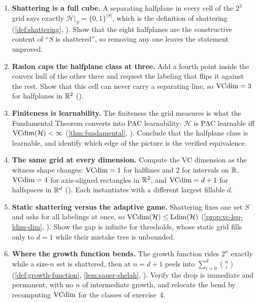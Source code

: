 \begin{enumerate}[leftmargin=*,itemsep=3pt]
\item \textbf{Shattering is a full cube.} A separating halfplane in every cell of the $2^3$ grid says exactly $\mathcal{H}|_S = \{0,1\}^{|S|}$, which is the definition of shattering (\cref{def:shattering}, ). Show that the eight halfplanes are the constructive content of ``$S$ is shattered'', so removing any one leaves the statement unproved.

\item \textbf{Radon caps the halfplane class at three.} Add a fourth point inside the convex hull of the other three and request the labeling that flips it against the rest. Show that this cell can never carry a separating line, so $\mathrm{VCdim} = 3$ for halfplanes in $\mathbb{R}^2$ ().

\item \textbf{Finiteness is learnability.} The finiteness the grid measures is what the Fundamental Theorem converts into PAC learnability: $\mathcal{H}$ is PAC learnable iff $\mathrm{VCdim}(\mathcal{H}) < \infty$ (\cref{thm:fundamental}, ). Conclude that the halfplane class is learnable, and identify which edge of the picture is the verified equivalence.

\item \textbf{The same grid at every dimension.} Compute the VC dimension as the witness shape changes: $\mathrm{VCdim} = 1$ for halflines and $2$ for intervals on $\mathbb{R}$, $\mathrm{VCdim} = 4$ for axis-aligned rectangles in $\mathbb{R}^2$, and $\mathrm{VCdim} = d+1$ for halfspaces in $\mathbb{R}^d$ (\cite{BlumerEhrenfeuchtHausslerWarmuth1989}). Each instantiates  with a different largest fillable $d$.

\item \textbf{Static shattering versus the adaptive game.} Shattering fixes one set $S$ and asks for all labelings at once, so $\mathrm{VCdim}(\mathcal{H}) \le \mathrm{Ldim}(\mathcal{H})$ (\cref{prop:vc-leq-ldim-dim}, ). Show the gap is infinite for thresholds, whose static grid fills only to $d=1$ while their mistake tree is unbounded.

\item \textbf{Where the growth function bends.} The growth function rides $2^n$ exactly while a size-$n$ set is shattered, then at $n=d+1$ peels into $\sum_{i=0}^{d}\binom{n}{i}$ (\cref{def:growth-function}, \cref{lem:sauer-shelah}, ). Verify the drop is immediate and permanent, with no $n$ of intermediate growth, and relocate the bend by recomputing $\mathrm{VCdim}$ for the classes of exercise~4.


\end{enumerate}
